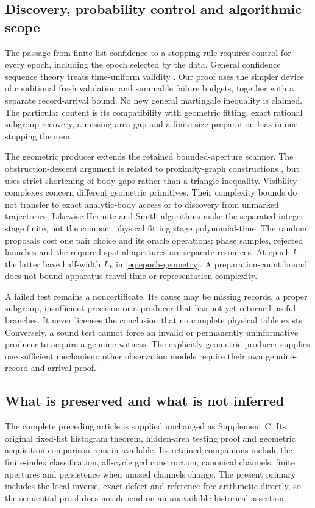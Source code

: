 \subsection{Discovery, probability control and algorithmic scope}
The passage from finite-list confidence to a stopping rule requires control
for every epoch, including the epoch selected by the data. General confidence
sequence theory treats time-uniform validity \cite{HRMS}. Our proof uses
the simpler device of conditional fresh validation and summable failure
budgets, together with a separate record-arrival bound. No new general
martingale inequality is claimed. The particular content is its compatibility
with geometric fitting, exact rational subgroup recovery, a missing-area
gap and a finite-size preparation bias in one stopping theorem.

The geometric producer extends the retained bounded-aperture scanner.
The obstruction-descent argument is related to proximity-graph constructions
\cite{Toussaint,JT}, but uses strict shortening of body gaps rather than
a triangle inequality. Visibility complexes \cite{PV} concern different
geometric primitives. Their complexity bounds do not transfer to exact
analytic-body access or to discovery from unmarked trajectories. Likewise
Hermite and Smith algorithms \cite{KB,Cohen} make the separated integer
stage finite, not the compact physical fitting stage polynomial-time.
The random proposals cost one pair choice and its oracle operations;
phase samples, rejected launches and the required spatial apertures are
separate resources. At epoch $k$ the latter have half-width $L_k$ in
\eqref{eq:epoch-geometry}. A preparation-count bound does not bound
apparatus travel time or representation complexity.

A failed test remains a noncertificate. Its cause may be missing records,
a proper subgroup, insufficient precision or a producer that has not yet
returned useful branches. It never licenses the conclusion that no complete
physical table exists. Conversely, a sound test cannot force an invalid
or permanently uninformative producer to acquire a genuine witness.
The explicitly geometric producer supplies one sufficient mechanism;
other observation models require their own genuine-record and arrival proof.

\subsection{What is preserved and what is not inferred}
The complete preceding article is supplied unchanged as Supplement C.
Its original fixed-list histogram theorem, hidden-area testing proof and
geometric acquisition comparison remain available. Its retained companions
include the finite-index classification, all-cycle gcd construction,
canonical channels, finite apertures and persistence when unused channels
change. The present primary includes the local inverse, exact defect and
reference-free arithmetic directly, so the sequential proof does not depend
on an unavailable historical assertion.

